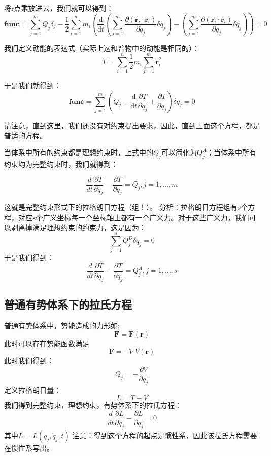 \documentclass[a4paper, 10pt, openany]{book}%
\begin{document}
    将r点乘放进去，我们就可以得到：
    \begin{equation}
      \textbf{func}=\sum_{j=1}^{m}Q_j\delta_j-\frac{1}{2}\sum_{i=1}^n m_i (\frac{\mathrm{d}}{\mathrm{d}t} (\sum_{j=1}^m \frac{\partial (\dot{\textbf{r}}_i\cdot\dot{\textbf{r}}_i)}{\partial \dot{q}_j}\delta q_j)- (\sum_{j=1}^m \frac{\partial (\dot{\textbf{r}}_i\cdot\dot{\textbf{r}}_i)}{\partial q_j}\delta q_j))=0
    \end{equation}
    
    我们定义动能的表达式（实际上这和普物中的动能是相同的）：
    \begin{equation}
        T=\sum_{i=1}^n \frac{1}{2}m_i\sum_{j=1}^m \dot{\textbf{r}}^2_i
    \end{equation}

    于是我们就得到：
    \begin{equation}
        \textbf{func}=\sum_{j=1}^m \left(Q_j-\frac{\mathrm{d}}{\mathrm{d}t}\frac{\partial T}{\partial \dot{q}_j}+\frac{\partial T}{\partial q_j}\right)\delta q_j=0   
          \end{equation}
    
          请注意，直到这里，我们还没有对约束提出要求，因此，直到上面这个方程，都是普适的方程。
    
          当体系中所有的约束都是理想约束时，上式中的$Q_j$可以简化为$Q_j^A$；当体系中所有约束均为完整约束时，我们就得到：

    \begin{equation}
        \frac{d}{dt}\frac{\partial T}{\partial \dot{q}_j}-\frac{\partial T}{\partial q_j}=Q_j,j=1,\dots,m
    \end{equation}

    这就是完整约束形式下的拉格朗日方程（组！）。
    分析：拉格朗日方程组有$s$个方程，对应$s$个广义坐标每一个坐标轴上都有一个广义力。对于这些广义力，我们可以剥离掉满足理想约束的约束力，这是因为：
    $$\sum_{j=1}^s Q^D_j\delta q_j=0$$
    于是我们得到：
    \begin{equation}
      \frac{d}{dt}\frac{\partial T}{\partial \dot{q}_j}-\frac{\partial T}{\partial q_j}=Q_j^A,j=1,\dots,s
    \end{equation}
    \subsection{普通有势体系下的拉氏方程}
    普通有势体系中，势能造成的力形如:
    $$\textbf{F}=\textbf{F}(\textbf{r})$$
    此时可以存在势能函数满足
    $$\textbf{F}=-\nabla V(\textbf{r})$$
    此时我们得到：
    $$Q_j=-\frac{\partial V}{\partial q_j}$$
    定义拉格朗日量：
    $$L=T-V$$
    我们得到完整约束，理想约束，有势体系下的拉氏方程：
    \begin{equation}
      \frac{d}{dt}\frac{\partial L}{\partial \dot{q}_j}-\frac{\partial L}{\partial q_j}=0
    \end{equation}
    其中$L=L(q_j,\dot{q}_j,t)$
    注意：得到这个方程的起点是惯性系，因此该拉氏方程需要在惯性系写出。
\end{document}
